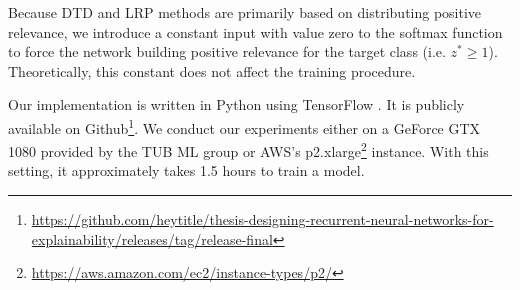  Because DTD and LRP methods are primarily  based on distributing positive relevance, we introduce a constant input with value zero to the softmax function to force the network building positive relevance for the target class (i.e.  $z^* \ge 1$). Theoretically, this constant does not affect the training procedure.

Our implementation is written in Python using TensorFlow \citep{AbadiTensorFlowLargeScaleMachine2016}. It is publicly available on Github\footnote{\url{https://github.com/heytitle/thesis-designing-recurrent-neural-networks-for-explainability/releases/tag/release-final}}.  We conduct our experiments either on a GeForce GTX 1080 provided by the TUB ML group or AWS's p2.xlarge\footnote{\url{https://aws.amazon.com/ec2/instance-types/p2/}} instance. With this setting, it approximately takes 1.5 hours to train a model.


 
%
%
%
%
%
%

